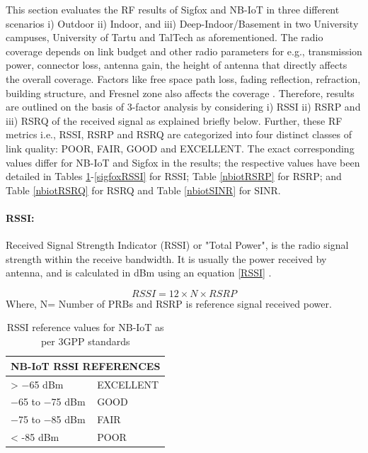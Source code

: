 \documentclass[12pt]{article}
\begin{document}
This section evaluates the RF results of Sigfox and NB-IoT in three different scenarios i) Outdoor ii) Indoor, and iii) Deep-Indoor/Basement in two University campuses, University of Tartu and TalTech as aforementioned. The radio coverage depends on link budget and other radio parameters for e.g., transmission power, connector loss, antenna gain, the height of antenna that directly affects the overall coverage. Factors like free space path loss, fading reflection, refraction, building structure, and Fresnel zone also affects the coverage \cite{sikora2019test,sikora2019performance}. Therefore, results are outlined on the basis of 3-factor analysis by considering i) RSSI ii) RSRP and iii) RSRQ of the received signal as explained briefly below. Further, these RF metrics i.e., RSSI, RSRP and RSRQ are categorized into four distinct classes of link quality: POOR, FAIR, GOOD and EXCELLENT. The exact corresponding values differ for NB-IoT and Sigfox in the results; the respective values have been detailed in Tables \ref{nbiotRSSI}-\ref{sigfoxRSSI} for RSSI;  Table \ref{nbiotRSRP} for RSRP; and Table \ref{nbiotRSRQ} for RSRQ and Table \ref{nbiotSINR} for SINR.


\paragraph{RSSI:}
Received Signal Strength Indicator (RSSI) or "Total  Power", is the radio  signal  strength  within  the  receive bandwidth. It is usually the power received by antenna, and is  calculated in dBm using an equation \ref{RSSI} \cite{3GPP}.

\begin{equation}
      RSSI = {12 \times N \times RSRP}
      \label{RSSI}
\end{equation}
Where, N= Number of PRBs and RSRP is reference signal received power.

\begin{table}[h]

\centering
\caption {RSSI reference values for NB-IoT as per 3GPP standards \cite{3GPP,sikora2019performance}}

\begin{tabular}{|p{5cm}|p{5cm}|}
\hline
\multicolumn{2}{|c|}{NB-IoT RSSI REFERENCES} \\ \hline
 > −65 dBm                           & EXCELLENT                     \\ \hline
−65 to −75 dBm                      & GOOD                          \\ \hline
−75 to −85 dBm                      & FAIR                          \\ \hline
< -85 dBm                           & POOR                          \\ \hline
\end{tabular}
\label{nbiotRSSI}

\end{table}
\end{document}
